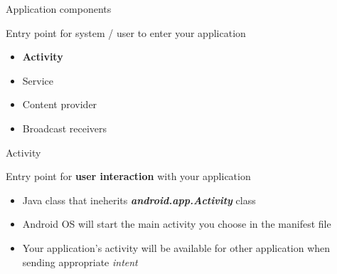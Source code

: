 \documentclass{beamer}
\begin{document}
   \begin{frame}{Application components}
   
     Entry point for system / user to enter your application
     \begin{itemize}

    	\item \textbf{Activity}
    	\item Service
    	\item Content provider
    	\item Broadcast receivers
	\end{itemize}
  \end{frame}
  
  
     \begin{frame}{Activity}
   
     Entry point for \textbf{user interaction} with your application
     \begin{itemize}
        \item Java class that ineherits \textbf{\textit{android.app.Activity}} class 
    	\item Android OS will start the main activity you choose in the manifest file
    	\item Your application's activity will be available for other application when sending appropriate \textit{intent}

	\end{itemize}
  \end{frame}
  
\end{document}
